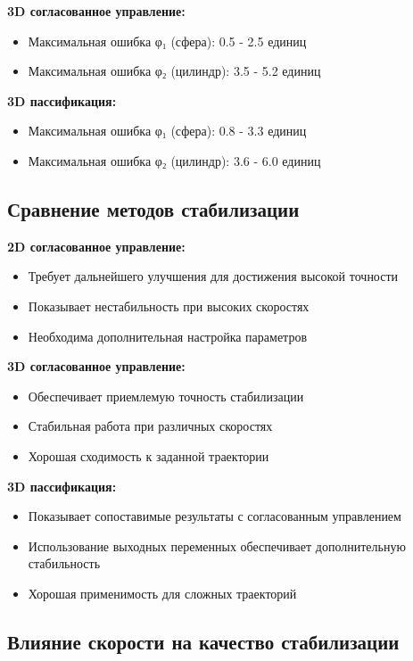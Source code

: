 \textbf{3D согласованное управление:}
\begin{itemize}
\item Максимальная ошибка φ₁ (сфера): 0.5 - 2.5 единиц
\item Максимальная ошибка φ₂ (цилиндр): 3.5 - 5.2 единиц
\end{itemize}

\textbf{3D пассификация:}
\begin{itemize}
\item Максимальная ошибка φ₁ (сфера): 0.8 - 3.3 единиц
\item Максимальная ошибка φ₂ (цилиндр): 3.6 - 6.0 единиц
\end{itemize}

\subsection{Сравнение методов стабилизации}

\textbf{2D согласованное управление:}
\begin{itemize}
\item Требует дальнейшего улучшения для достижения высокой точности
\item Показывает нестабильность при высоких скоростях
\item Необходима дополнительная настройка параметров
\end{itemize}

\textbf{3D согласованное управление:}
\begin{itemize}
\item Обеспечивает приемлемую точность стабилизации
\item Стабильная работа при различных скоростях
\item Хорошая сходимость к заданной траектории
\end{itemize}

\textbf{3D пассификация:}
\begin{itemize}
\item Показывает сопоставимые результаты с согласованным управлением
\item Использование выходных переменных обеспечивает дополнительную стабильность
\item Хорошая применимость для сложных траекторий
\end{itemize}

\subsection{Влияние скорости на качество стабилизации}

